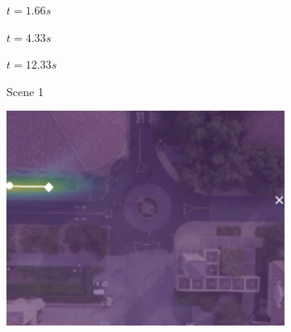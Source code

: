 \documentclass[letterpaper,10pt,conference]{ieeeconf}
\begin{document}
\begin{figure}[t!]
\begin{subfigure}[t]{0.48\textwidth}
	\vspace{0.2cm}
	\hspace{.5cm}
	\begin{minipage}{0.3\linewidth}
		\centering
		$t = 1.66s$
	\end{minipage}
	\begin{minipage}{0.3\linewidth}
		\centering
		$t = 4.33s$
	\end{minipage}
	\begin{minipage}{0.3\linewidth}
		\centering
		$t = 12.33s$
	\end{minipage}
	\caption{Scene 1}
	\label{fig:bookstore-1-2}
	\end{subfigure} 
	\hspace*{0.5cm}
	\begin{subfigure}[t]{0.48\textwidth}
	\centering
	\begin{minipage}[c]{0.47cm}
	\end{minipage}
	\begin{minipage}[c]{0.3\linewidth}
		\includegraphics[width=\linewidth]{./figures/comparison/ours_death_1_2_t=70.jpg}

\end{minipage}
\end{subfigure}
\end{figure}
\end{document}
